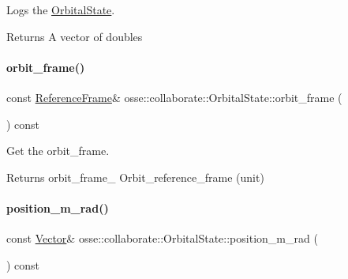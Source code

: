 Logs the \hyperlink{classosse_1_1collaborate_1_1_orbital_state}{Orbital\+State}. 

\begin{DoxyReturn}{Returns}
A vector of doubles 
\end{DoxyReturn}
\mbox{\label{classosse_1_1collaborate_1_1_orbital_state_a9704e21bdf2ed6245b4b27e5a2911310}} 
\paragraph{\texorpdfstring{orbit\+\_\+frame()}{orbit\_frame()}}
{\footnotesize\ttfamily const \hyperlink{classosse_1_1collaborate_1_1_reference_frame}{Reference\+Frame}\& osse\+::collaborate\+::\+Orbital\+State\+::orbit\+\_\+frame (\begin{DoxyParamCaption}{ }\end{DoxyParamCaption}) const\hspace{0.3cm}{\ttfamily [inline]}}



Get the orbit\+\_\+frame. 

\begin{DoxyReturn}{Returns}
orbit\+\_\+frame\+\_\+ Orbit\+\_\+reference\+\_\+frame (unit) 
\end{DoxyReturn}
\mbox{\label{classosse_1_1collaborate_1_1_orbital_state_a09eef3c4ce4d5a6aff3b6cee6e1dea0e}} 
\paragraph{\texorpdfstring{position\+\_\+m\+\_\+rad()}{position\_m\_rad()}}
{\footnotesize\ttfamily const \hyperlink{classosse_1_1collaborate_1_1_vector}{Vector}\& osse\+::collaborate\+::\+Orbital\+State\+::position\+\_\+m\+\_\+rad (\begin{DoxyParamCaption}{ }\end{DoxyParamCaption}) const\hspace{0.3cm}{\ttfamily [inline]}}



